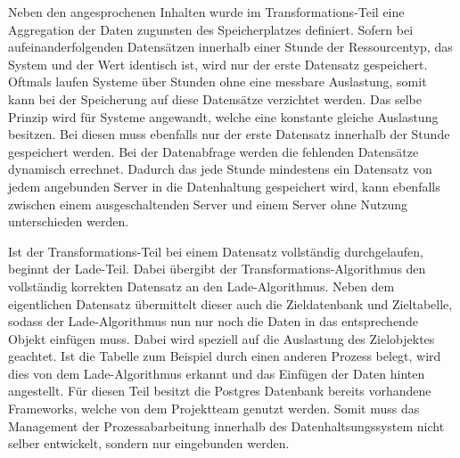 Neben den angesprochenen Inhalten wurde im Transformations\hyp{}Teil eine
Aggregation der Daten zugunsten des Speicherplatzes definiert. Sofern
bei aufeinanderfolgenden Datensätzen innerhalb einer Stunde der
Ressourcentyp, das System und der Wert identisch ist, wird nur der erste
Datensatz gespeichert. Oftmals laufen Systeme über Stunden ohne eine messbare
Auslastung, somit kann bei der Speicherung auf diese Datensätze verzichtet
werden. Das selbe Prinzip wird für Systeme angewandt, welche eine konstante
gleiche Auslastung besitzen. Bei diesen muss ebenfalls nur der erste Datensatz
innerhalb der Stunde gespeichert werden. Bei der Datenabfrage werden die
fehlenden Datensätze dynamisch errechnet. Dadurch das jede Stunde mindestens
ein Datensatz von jedem angebunden Server in die Datenhaltung gespeichert wird,
kann ebenfalls zwischen einem ausgeschaltenden Server und einem Server ohne
Nutzung unterschieden werden.

Ist der Transformations\hyp{}Teil bei einem Datensatz vollständig
durchgelaufen, beginnt der Lade\hyp{}Teil. Dabei übergibt der
Transformations\hyp{}Algorithmus den vollständig korrekten Datensatz an den
Lade\hyp{}Algorithmus. Neben dem eigentlichen Datensatz übermittelt dieser
auch die Zieldatenbank und Zieltabelle, sodass der Lade\hyp{}Algorithmus nun
nur noch die Daten in das entsprechende Objekt einfügen muss. Dabei wird
speziell auf die Auslastung des Zielobjektes geachtet. Ist die Tabelle zum
Beispiel durch einen anderen Prozess belegt, wird dies von dem
Lade\hyp{}Algorithmus erkannt und das Einfügen der Daten hinten angestellt. Für
diesen Teil besitzt die Postgres Datenbank bereits vorhandene Frameworks,
welche von dem Projektteam genutzt werden. Somit muss das Management der
Prozessabarbeitung innerhalb des Datenhaltsungssystem nicht selber entwickelt,
sondern nur eingebunden werden.
\nl%

